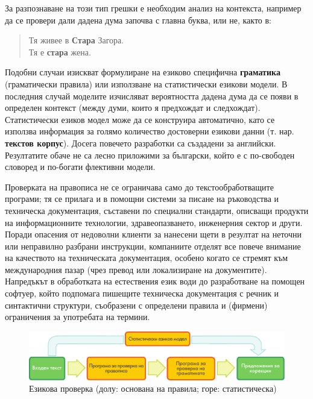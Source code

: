 \documentclass[]{../../metanetpaper}
\begin{document}
\begin{multicols}{2}
За разпознаване на този тип грешки е необходим анализ на контекста, например да се провери дали дадена дума започва с главна буква, или не, както в: 

\begin{quote}
  Тя живее в \textbf{Стара} Загора.\\
  Тя е \textbf{стара} жена.
\end{quote}

Подобни случаи изискват формулиране на езиково специфична \textbf{граматика} (граматически правила) или използване на статистически езикови модели. В последния случай моделите изчисляват вероятността дадена дума да се появи в определен контекст (между думи, които я предхождат и следхождат). 
Статистически езиков модел може да се конструира автоматично, като се използва информация за голямо количество достоверни езикови данни (т. нар. \textbf{текстов корпус}). Досега повечето разработки са създадени за английски. Резултатите обаче не са лесно приложими за български, който е с по-свободен словоред и по-богати флективни модели. 

Проверката на правописа не се ограничава само до текстообработващите програми; тя се прилага и в помощни системи за писане на ръководства и техническа документация, съставени по специални стандарти, описващи продукти на информационните технологии, здравеопазването, инженерния сектор и други. 
Поради опасения от недоволни клиенти за нанесени щети в резултат на неточни или неправилно разбрани инструкции, компаниите отделят все повече внимание на качеството на техническата документация, особено когато се стремят към международния пазар (чрез превод или локализиране на документите).
Напредъкът в обработката на естествения език води до разработване на помощен софтуер, който подпомага пишещите техническа документация с речник и синтактични структури, съобразени с определени правила и (фирмени) ограничения за употребата на термини. 

\begin{figure}[htb]
  \center
  \includegraphics[width=\textwidth]{../_media/bulgarian/language_checking}
  \caption{Езикова проверка (долу: основана на правила; горе: статистическа)}
  \label{fig:langcheckingaarch_de}
\end{figure}


\end{multicols}
\end{document}
